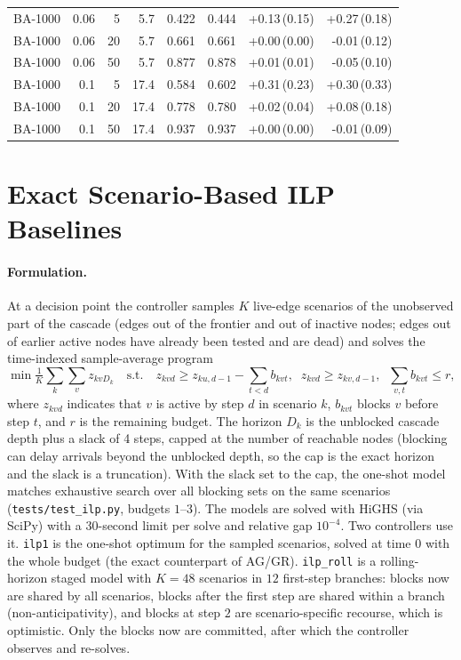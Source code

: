 \documentclass[ASNA,number]{USG}
\begin{document}
\begin{table}[h]
\begin{tabular}{lrrrrrrr}
BA-1000 & 0.06 & 5 & 5.7 & 0.422 & 0.444 & +0.13\,(0.15) & +0.27\,(0.18) \\
BA-1000 & 0.06 & 20 & 5.7 & 0.661 & 0.661 & +0.00\,(0.00) & -0.01\,(0.12) \\
BA-1000 & 0.06 & 50 & 5.7 & 0.877 & 0.878 & +0.01\,(0.01) & -0.05\,(0.10) \\
BA-1000 & 0.1 & 5 & 17.4 & 0.584 & 0.602 & +0.31\,(0.23) & +0.30\,(0.33) \\
BA-1000 & 0.1 & 20 & 17.4 & 0.778 & 0.780 & +0.02\,(0.04) & +0.08\,(0.18) \\
BA-1000 & 0.1 & 50 & 17.4 & 0.937 & 0.937 & +0.00\,(0.00) & -0.01\,(0.09) \\
\hline
\end{tabular}
\end{table}

\section{Exact Scenario-Based ILP Baselines}\label{ec:ilp}

\paragraph{Formulation.} At a decision point the controller samples $K$
live-edge scenarios of the unobserved part of the cascade (edges out of the
frontier and out of inactive nodes; edges out of earlier active nodes have
already been tested and are dead) and solves the time-indexed sample-average
program
\[
\min \tfrac1K\sum_k\sum_v z_{kvD_k}\quad\text{s.t.}\quad
z_{kvd}\ge z_{ku,d-1}-\sum_{t<d}b_{kvt},\;\; z_{kvd}\ge z_{kv,d-1},\;\;
\sum_{v,t}b_{kvt}\le r,
\]
where $z_{kvd}$ indicates that $v$ is active by step $d$ in scenario $k$,
$b_{kvt}$ blocks $v$ before step $t$, and $r$ is the remaining budget. The
horizon $D_k$ is the unblocked cascade depth plus a slack of 4 steps, capped at
the number of reachable nodes (blocking can delay arrivals beyond the unblocked
depth, so the cap is the exact horizon and the slack is a truncation). With
the slack set to the cap, the one-shot model matches exhaustive search over all
blocking sets on the same scenarios (\texttt{tests/test\_ilp.py}, budgets
$1$--$3$). The models are solved with HiGHS (via SciPy) with a 30-second limit per
solve and relative gap $10^{-4}$. Two controllers use it.
\texttt{ilp1} is the one-shot optimum for the sampled scenarios, solved at time
$0$ with the whole budget (the exact counterpart of AG/GR).
\texttt{ilp\_roll} is a rolling-horizon staged model with $K=48$ scenarios in
$12$ first-step branches: blocks now are shared by all scenarios, blocks after
the first step are shared within a branch (non-anticipativity), and blocks at
step $2$ are scenario-specific recourse, which is optimistic. Only the blocks
now are committed, after which the controller observes and re-solves.
\end{document}
